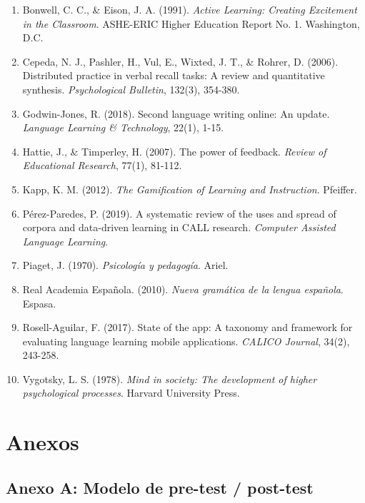 \documentclass[12pt,spanish]{article}
\begin{document}
\begin{enumerate}
    \item Bonwell, C. C., \& Eison, J. A. (1991). \textit{Active Learning: Creating Excitement in the Classroom}. ASHE-ERIC Higher Education Report No. 1. Washington, D.C.

    \item Cepeda, N. J., Pashler, H., Vul, E., Wixted, J. T., \& Rohrer, D. (2006). Distributed practice in verbal recall tasks: A review and quantitative synthesis. \textit{Psychological Bulletin}, 132(3), 354-380.

    \item Godwin-Jones, R. (2018). Second language writing online: An update. \textit{Language Learning \& Technology}, 22(1), 1-15.

    \item Hattie, J., \& Timperley, H. (2007). The power of feedback. \textit{Review of Educational Research}, 77(1), 81-112.

    \item Kapp, K. M. (2012). \textit{The Gamification of Learning and Instruction}. Pfeiffer.

    \item Pérez-Paredes, P. (2019). A systematic review of the uses and spread of corpora and data-driven learning in CALL research. \textit{Computer Assisted Language Learning}.

    \item Piaget, J. (1970). \textit{Psicología y pedagogía}. Ariel.

    \item Real Academia Española. (2010). \textit{Nueva gramática de la lengua española}. Espasa.

    \item Rosell-Aguilar, F. (2017). State of the app: A taxonomy and framework for evaluating language learning mobile applications. \textit{CALICO Journal}, 34(2), 243-258.

    \item Vygotsky, L. S. (1978). \textit{Mind in society: The development of higher psychological processes}. Harvard University Press.
\end{enumerate}

\newpage
\section{Anexos}

\subsection{Anexo A: Modelo de pre-test / post-test}
\end{document}

